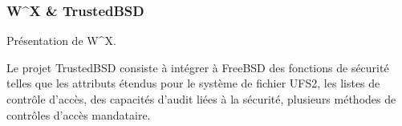 \documentclass[pdftex,a4paper,titlepage,11pt]{article}
\begin{document}
\subsubsection{W\^{}X \& TrustedBSD}

Présentation de W\^{}X.

Le projet TrustedBSD consiste à intégrer à FreeBSD des fonctions de sécurité telles que les attributs étendus pour le système de fichier UFS2, les listes de contrôle d'accès, des capacités d'audit liées à la sécurité, plusieurs méthodes de contrôles d'accès mandataire.

%

%
%
%

\newpage
\end{document}
